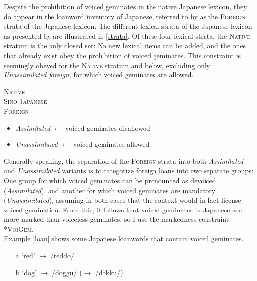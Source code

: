 \documentclass{article}
\begin{document}
Despite the prohibition of voiced geminates in the native Japanese lexicon, they do appear in the loanword inventory of Japanese, referred to by \cite{Ito&Mester1999} as the \textsc{Foreign} strata of the Japanese lexicon. The different lexical strata of the Japanese lexicon as presented by \cite{Ito&Mester1999} are illustrated in \ref{strata}. Of these four lexical strata, the \textsc{Native} stratum is the only closed set: No new lexical items can be added, and the ones that already exist obey the prohibition of voiced geminates. This constraint is seemingly obeyed for the \textsc{Native} stratum and below, excluding only \textit{Unassimilated foreign}, for which voiced geminates are allowed.

\begin{exe}
	\ex
    \label{strata}
        	\textsc{Native} \\
        	\textsc{Sino-Japanese} \\
        	\textsc{Foreign}
        	\begin{itemize}
        	    \item \textit{Assimilated} $\leftarrow$ voiced geminates disallowed
        	    \item \textit{Unassimilated} $\leftarrow$ voiced geminates allowed
        	\end{itemize}
\end{exe}

Generally speaking, the separation of the \textsc{Foreign} strata into both \textit{Assimilated} and \textit{Unassimilated} variants is to categorize foreign loans into two separate groups: One group for which voiced geminates can be pronounced as devoiced (\textit{Assimilated}), and another for which voiced geminates are mandatory (\textit{Unassimilated}), assuming in both cases that the context would in fact license voiced gemination. From this, it follows that voiced geminates in Japanese are more marked than voiceless geminates, so I use the markedness constraint \textsc{*VoiGem}. \\

Example \ref{loan} \citep[p. 3]{Kawahara2015} shows some Japanese loanwords that contain voiced geminates.

\begin{exe}
    \ex
    \label{loan}
    \begin{itemize}
        \item [a] ‘red' $\rightarrow$ /reddo/
        \item [b] ‘dog' $\rightarrow$ /doggu/ ($\rightarrow$ /dokku/)
    \end{itemize}
\end{exe}
\end{document}
